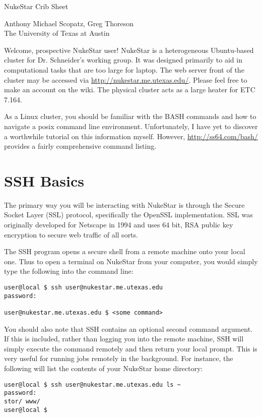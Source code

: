 \documentclass[a4paper, 12pt]{article}
\begin{document}
\begin{center}

NukeStar Crib Sheet
\vspace{10mm}

Anthony Michael Scopatz, Greg Thoreson\\
The University of Texas at Austin
\end{center}
\vspace{5mm}

Welcome, prospective NukeStar user!  NukeStar is a heterogeneous Ubuntu-based cluster for Dr. Schneider's working group.
It was designed primarily to aid in computational tasks that are too large for laptop.  The web server front of
the cluster may be accessed via \url{http://nukestar.me.utexas.edu/}.  Please feel free to make an account on the 
wiki.  The physical cluster acts as a large heater for ETC 7.164.

As a Linux cluster, you should be familiar with the BASH commands and how to navigate a posix command
line environment.  Unfortunately, I have yet to discover a worthwhile tutorial on this information myself.  
However, \url{http://ss64.com/bash/} provides a fairly comprehensive command listing.  

\section{SSH Basics} 
The primary way you will be interacting with NukeStar is through the Secure Socket Layer (SSL) protocol, specifically
the OpenSSL implementation.  SSL was originally developed for Netscape in 1994 and uses 64 bit, RSA public key encryption 
to secure web traffic of all sorts.

The SSH program opens a secure shell from a remote machine onto your local one.  Thus to open a terminal on NukeStar 
from your computer, you would simply type the following into the command line:
\begin{verbatim}
user@local $ ssh user@nukestar.me.utexas.edu
password:

user@nukestar.me.utexas.edu $ <some command> 
\end{verbatim}

You should also note that SSH contains an optional second command argument.  If this is included, rather than logging you into 
the remote machine, SSH will simply execute the command remotely and then return your local prompt.  
This is very useful for running jobs remotely in the background.
For instance, the following  will list the contents of your NukeStar home directory:
\begin{verbatim}
user@local $ ssh user@nukestar.me.utexas.edu ls ~
password:
stor/ www/
user@local $
\end{verbatim}
\end{document}
